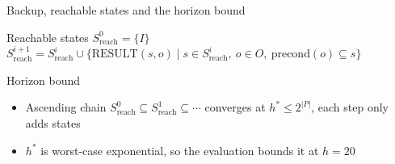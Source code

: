 
\begin{frame}[noframenumbering]{Backup, reachable states and the horizon bound}
    \hypertarget{bk:reachability}{}
    \begin{block}{Reachable states}
        $S^0_{\text{reach}} = \{I\}$ \\[2pt]
        $S^{i+1}_{\text{reach}} = S^i_{\text{reach}} \cup \{\text{RESULT}(s, o) \mid s \in S^i_{\text{reach}},\ o \in O,\ \text{precond}(o) \subseteq s\}$
    \end{block}

    \begin{block}{Horizon bound}
        \begin{itemize}
            \item Ascending chain $S^0_{\text{reach}} \subseteq S^1_{\text{reach}} \subseteq \cdots$ converges at $h^* \leq 2^{|P|}$, each step only adds states
            \item $h^*$ is worst-case exponential, so the evaluation bounds it at $h = 20$
        \end{itemize}
    \end{block}

\end{frame}

